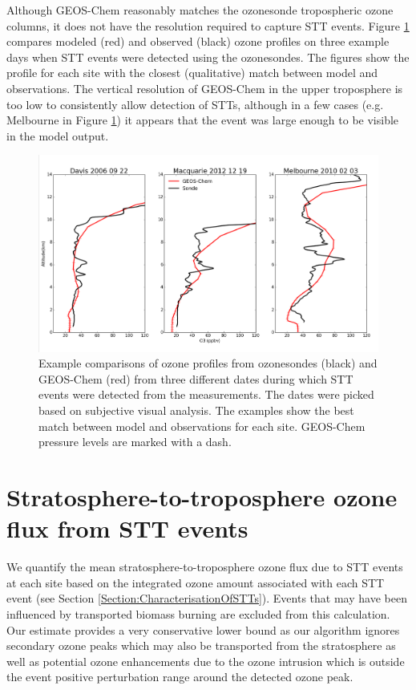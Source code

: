 \documentclass{article}
\begin{document}
  Although GEOS-Chem reasonably matches the ozonesonde tropospheric ozone columns, it does not have the resolution required to capture STT events.
  Figure \ref{fig:event_profile_comparison} compares modeled (red) and observed (black) ozone profiles on three example days when STT events were detected using the ozonesondes. 
  The figures show the profile for each site with the closest (qualitative) match between model and observations.
  The vertical resolution of GEOS-Chem in the upper troposphere is too low to consistently allow detection of STTs, although in a few cases (e.g. Melbourne in Figure \ref{fig:event_profile_comparison}) it appears that the event was large enough to be visible in the model output.
  
  \begin{figure}[!htbp]
    \includegraphics[width=\textwidth]{figures/event_profile_comparison.png}
    \caption{%
      Example comparisons of ozone profiles from ozonesondes (black) and GEOS-Chem (red) from three different dates during which STT events were detected from the measurements.
      The dates were picked based on subjective visual analysis. 
      The examples show the best match between model and observations for each site.
      GEOS-Chem pressure levels are marked with a dash.}
    \label{fig:event_profile_comparison}
  \end{figure}
  
\section{Stratosphere-to-troposphere ozone flux from STT events}
  
  We quantify the mean stratosphere-to-troposphere ozone flux due to STT events at each site based on the integrated ozone amount associated with each STT event (see Section \ref{Section:CharacterisationOfSTTs}).
  Events that may have been influenced by transported biomass burning are excluded from this calculation.
  Our estimate provides a very conservative lower bound as our algorithm ignores secondary ozone peaks which may also be transported from the stratosphere as well as potential ozone enhancements due to the ozone intrusion which is outside the event positive perturbation range around the detected ozone peak.
  
\end{document}
